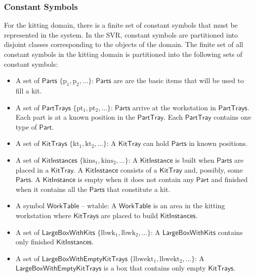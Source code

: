 \documentclass[a4paper, 10pt, conference]{ieeeconf}      %
\begin{document}
\subsubsection{Constant Symbols}
For the kitting domain, there is a finite set of constant symbols that must be represented in the system.
In the SVR, constant symbols are partitioned into disjoint classes corresponding to the objects of the domain. The finite set of all constant symbols in the kitting domain is partitioned into the following sets of constant symbols:
\begin{itemize}
\item A set of $\mathsf{Parts}$ $\lbrace\mathrm{p_1,p_2,\dots\rbrace}$: $\mathsf{Parts}$ are are the basic items that will be used to fill a kit.

\item A set of $\mathsf{PartTrays}$ $\lbrace\mathrm{pt_1,pt_2,\dots\rbrace}$: $\mathsf{Parts}$ arrive at the workstation in $\mathsf{PartTrays}$. Each part is at a known position in the $\mathsf{PartTray}$. Each $\mathsf{PartTray}$ contains one type of $\mathsf{Part}$.

\item A set of $\mathsf{KitTrays}$ $\lbrace\mathrm{kt_1, kt_2,\dots\rbrace}$:  A $\mathsf{KitTray}$ can hold $\mathsf{Parts}$ in known positions.

\item A set of $\mathsf{KitInstances}$ $\lbrace\mathrm{kins_1,kins_2,\dots\rbrace}$: A $\mathsf{KitInstance}$ is built when $\mathsf{Parts}$ are placed in a $\mathsf{KitTray}$. A $\mathsf{KitInstance}$ consists of a $\mathsf{KitTray}$ and, possibly, some $\mathsf{Parts}$. A $\mathsf{KitInstance}$ is empty when it does not contain any $\mathsf{Part}$ and finished when it contains all the $\mathsf{Parts}$ that constitute a kit.

\item A symbol $\mathsf{WorkTable}$ -- $\mathrm{wtable}$: A $\mathsf{WorkTable}$ is an area in the kitting workstation where $\mathsf{KitTrays}$ are placed to build $\mathsf{KitInstances}$.

\item A set of $\mathsf{LargeBoxWithKits}$ $\lbrace\mathrm{lbwk_1,lbwk_2,\dots\rbrace}$: A $\mathsf{LargeBoxWithKits}$ contains only finished $\mathsf{KitInstances}$.

\item A set of $\mathsf{LargeBoxWithEmptyKitTrays}$ $\lbrace\mathrm{lbwekt_1,lbwekt_2,\dots\rbrace}$: A $\mathsf{LargeBoxWithEmptyKitTrays}$ is a box that contains only empty $\mathsf{KitTrays}$.


\end{itemize}
\end{document}
